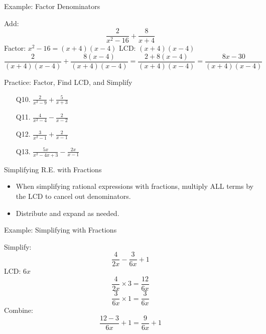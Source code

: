 \documentclass[aspectratio=169]{beamer}
\begin{document}
\begin{frame}{Example: Factor Denominators}
\begin{tcolorbox}[colback=lightgray,colframe=secondary,title=Example 3]
\footnotesize
Add:
\[
\frac{2}{x^2-16} + \frac{8}{x+4}
\]
Factor: $x^2-16 = (x+4)(x-4)$
LCD: $(x+4)(x-4)$
\[
\frac{2}{(x+4)(x-4)} + \frac{8(x-4)}{(x+4)(x-4)} = \frac{2 + 8(x-4)}{(x+4)(x-4)} = \frac{8x-30}{(x+4)(x-4)}
\]
\end{tcolorbox}
\end{frame}

\begin{frame}{Practice: Factor, Find LCD, and Simplify}
\begin{tcolorbox}[colback=lightgray,colframe=primary,title=Practice Problems]
\footnotesize
\begin{enumerate}
  \item[Q10.] $\frac{2}{x^2-9} + \frac{5}{x+3}$
  \item[Q11.] $\frac{4}{x^2-4} - \frac{2}{x-2}$
  \item[Q12.] $\frac{3}{x^2-1} + \frac{2}{x-1}$
  \item[Q13.] $\frac{5x}{x^2-4x+3} - \frac{2x}{x-1}$
\end{enumerate}
\end{tcolorbox}
\end{frame}

\begin{frame}{Simplifying R.E. with Fractions}
\begin{tcolorbox}[colback=lightgray,colframe=primary,title=Key Concepts]
\footnotesize
\begin{itemize}
  \item When simplifying rational expressions with fractions, multiply ALL terms by the LCD to cancel out denominators.
  \item Distribute and expand as needed.
\end{itemize}
\end{tcolorbox}
\end{frame}

\begin{frame}{Example: Simplifying with Fractions}
\begin{tcolorbox}[colback=lightgray,colframe=secondary,title=Example 4]
\footnotesize
Simplify:
\[
\frac{4}{2x} - \frac{3}{6x} + 1
\]
LCD: $6x$
\[
\frac{4}{2x} \times 3 = \frac{12}{6x}
\]
\[
\frac{3}{6x} \times 1 = \frac{3}{6x}
\]
Combine:
\[
\frac{12-3}{6x} + 1 = \frac{9}{6x} + 1
\]
\end{tcolorbox}
\end{frame}
\end{document}
